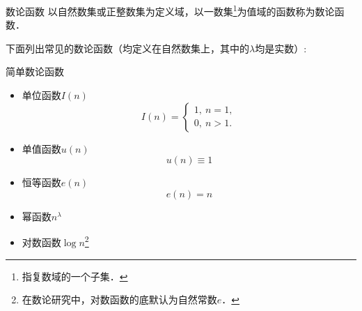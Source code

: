 

\begin{issues}
\issueDraft
\issueMissDepend
\end{issues}

\begin{definition}{数论函数}
以自然数集或正整数集为定义域，以一数集\footnote{指复数域的一个子集．}为值域的函数称为数论函数．
\end{definition}

下面列出常见的数论函数（均定义在自然数集上，其中的$\lambda$均是实数）:
\begin{example}{简单数论函数}
\begin{itemize}
\item 单位函数$I(n)$
\begin{equation}
I(n) =
\begin{cases}
1,\ n = 1,\\
0,\ n > 1.
\end{cases}
\end{equation}
\item 单值函数$u(n)$
\begin{equation}
u(n)\equiv1
\end{equation}
\item 恒等函数$e(n)$
\begin{equation}
e(n)=n
\end{equation}
\item 幂函数$n^\lambda$
\item 对数函数$\log n$\footnote{在数论研究中，对数函数的底默认为自然常数$e$．}
\end{itemize}
\end{example}
